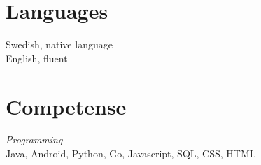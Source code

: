 \documentclass[margin, 10pt]{res} %
\begin{document}
\begin{resume}

\section{Languages}
Swedish, native language \\
English, fluent


\section{Competense}
{\sl Programming} \\
Java, Android, Python, Go, Javascript, SQL, CSS, HTML



\end{resume}
\end{document}
